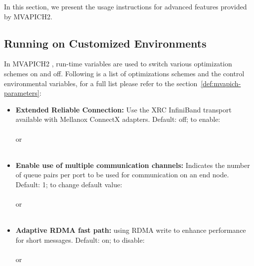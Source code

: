 In this section, we present the usage instructions for advanced features
provided by MVAPICH2.




\subsection{Running on Customized Environments}
\label{subsec:mpi-opt}

In MVAPICH2 \mvapichversion, run-time variables are used to switch various optimization
schemes on and off. Following is a list of optimizations schemes and the
control environmental variables, for a full list please refer
to the section~\ref{def:mvapich-parameters}:

\begin{itemize}
\item {\bf Extended Reliable Connection:} Use the XRC InfiniBand transport
available with Mellanox ConnectX adapters. Default: off; to enable:
\\
\\
or \\
\\

\item {\bf Enable use of multiple communication channels:} Indicates the
number of queue pairs per port to be used for communication on an end
node. Default: 1; to change default value:
\\
\\
or \\
\\
\end{itemize}

\begin{itemize}
\item {\bf Adaptive RDMA fast path:} using RDMA write to enhance
		performance for short messages. Default: on; to disable:
\\
\\
or \\
\\
\end{itemize}

